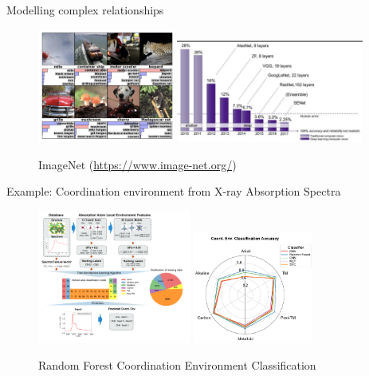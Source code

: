 \documentclass[aspectratio=169]{beamer}
\begin{document}
\begin{frame}{Modelling complex relationships}
    \begin{figure}
        \centering
        \includegraphics[width=0.4\textwidth]{lectures/slides_tex/figures/imagenet.png}
        \includegraphics[width=0.55\textwidth]{lectures/slides_tex/figures/imagenetperf.png}
        \caption{ImageNet (\url{https://www.image-net.org/})}
    \end{figure}
\end{frame}


\begin{frame}{Example: Coordination environment from X-ray Absorption Spectra}
    \begin{figure}
        \centering
        \includegraphics[width=0.45\textwidth]{lectures/slides_tex/figures/xasflowchart.pdf}
        \includegraphics[width=0.35\textwidth]{lectures/slides_tex/figures/xasaccuracy.pdf}
        \caption{Random Forest Coordination Environment Classification\cite{zhengRandomForestModels2020}}
    \end{figure}
\end{frame}
\end{document}
